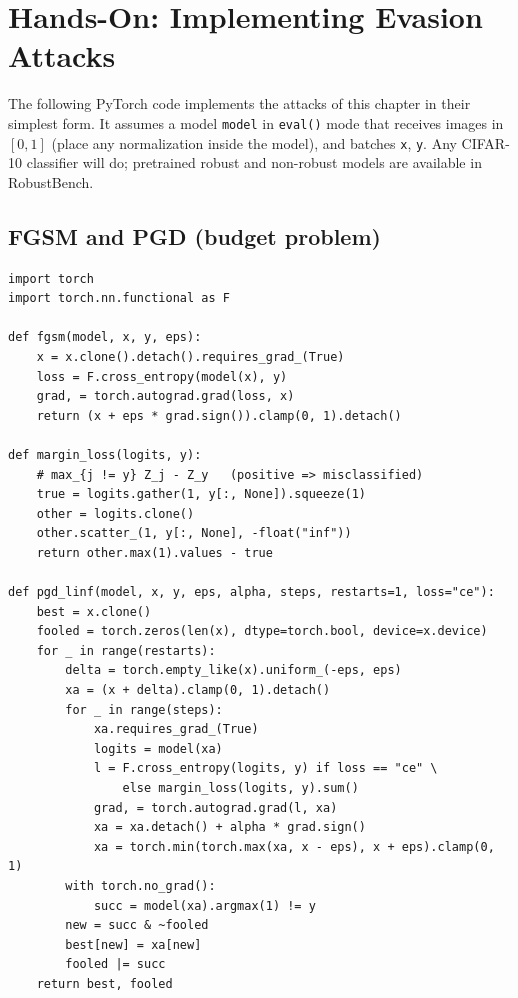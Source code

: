 \documentclass[10pt,a4paper]{extarticle}
\theoremstyle{definition}
\begin{document}
\section{Hands-On: Implementing Evasion Attacks}

The following PyTorch code implements the attacks of this chapter in their simplest form. It assumes a model \texttt{model} in \texttt{eval()} mode that receives images in \([0,1]\) (place any normalization inside the model), and batches \texttt{x}, \texttt{y}. Any CIFAR-10 classifier will do; pretrained robust and non-robust models are available in RobustBench.

\subsection{FGSM and PGD (budget problem)}

\begin{lstlisting}
import torch
import torch.nn.functional as F

def fgsm(model, x, y, eps):
    x = x.clone().detach().requires_grad_(True)
    loss = F.cross_entropy(model(x), y)
    grad, = torch.autograd.grad(loss, x)
    return (x + eps * grad.sign()).clamp(0, 1).detach()

def margin_loss(logits, y):
    # max_{j != y} Z_j - Z_y   (positive => misclassified)
    true = logits.gather(1, y[:, None]).squeeze(1)
    other = logits.clone()
    other.scatter_(1, y[:, None], -float("inf"))
    return other.max(1).values - true

def pgd_linf(model, x, y, eps, alpha, steps, restarts=1, loss="ce"):
    best = x.clone()
    fooled = torch.zeros(len(x), dtype=torch.bool, device=x.device)
    for _ in range(restarts):
        delta = torch.empty_like(x).uniform_(-eps, eps)
        xa = (x + delta).clamp(0, 1).detach()
        for _ in range(steps):
            xa.requires_grad_(True)
            logits = model(xa)
            l = F.cross_entropy(logits, y) if loss == "ce" \
                else margin_loss(logits, y).sum()
            grad, = torch.autograd.grad(l, xa)
            xa = xa.detach() + alpha * grad.sign()
            xa = torch.min(torch.max(xa, x - eps), x + eps).clamp(0, 1)
        with torch.no_grad():
            succ = model(xa).argmax(1) != y
        new = succ & ~fooled
        best[new] = xa[new]
        fooled |= succ
    return best, fooled
\end{lstlisting}
\end{document}
